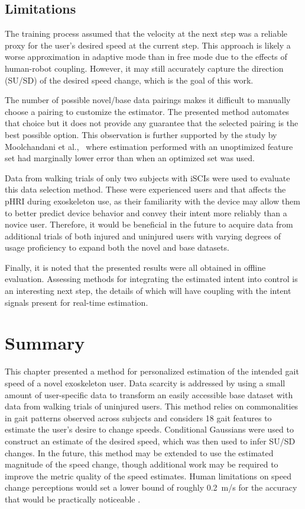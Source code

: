 \subsection{Limitations}

The training process assumed that the velocity at the next step was a reliable proxy for the user's desired speed at the current step.  This approach is likely a worse approximation in adaptive mode than in free mode due to the effects of human-robot coupling. However, it may still accurately capture the direction (SU/SD) of the desired speed change, which is the goal of this work.

The number of possible novel/base data pairings makes it difficult to manually choose a pairing to customize the estimator. The presented method automates that choice but it does not provide any guarantee that the selected pairing is the best possible option. This observation is further supported by the study  by Moolchandani et al.,~\cite{moolchandani2021design} where estimation performed with an unoptimized feature set had marginally lower error than when an optimized set was used. 

Data from walking trials of only two subjects with iSCIs were used to evaluate this data selection method. These were experienced users and that affects the pHRI during exoskeleton use, as their familiarity with the device may allow them to better predict device behavior and convey their intent more reliably than a novice user. Therefore, it would be beneficial in the future to acquire data from additional trials of both injured and uninjured users with varying degrees of usage proficiency to expand both the novel and base datasets.

Finally, it is noted that the presented results were all obtained in offline evaluation. Assessing methods for integrating the estimated intent into control is an interesting next step, the details of which will have coupling with the intent signals present for real-time estimation.

\section{Summary} \label{sec:conclusion}
%
This chapter presented a method for personalized estimation of the intended gait speed of a novel exoskeleton user. Data scarcity is addressed by using a small amount of user-specific data to transform an easily accessible base dataset with data from walking trials of uninjured users. This method relies on commonalities in gait patterns observed across subjects and considers 18 gait features to estimate the user's desire to change speeds. Conditional Gaussians were used to construct an estimate of the desired speed, which was then used to infer SU/SD changes. In the future, this method may be extended to use the estimated magnitude of the speed change, though additional work may be required to improve the metric quality of the speed estimates. Human limitations on speed change perceptions would set a lower bound of roughly 0.2~m/s for the  accuracy that would be practically noticeable \cite{zhang2015investigation}.

